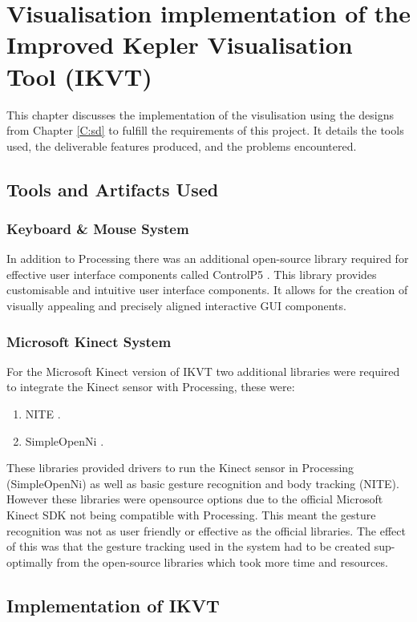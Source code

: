 \chapter{Visualisation implementation of the Improved Kepler Visualisation Tool
(IKVT)}\label{C:imp}
This chapter discusses the implementation of the visulisation using the designs
from Chapter \ref{C:sd} to fulfill the requirements of this project.
It details the tools used, the deliverable features
produced, and the problems encountered. 

\section{Tools and Artifacts Used}
\subsection{Keyboard \& Mouse System}
In addition to Processing there was an additional open-source
library required for effective user interface components called ControlP5
\cite{controlp5}. This library provides customisable and intuitive user
interface components. It allows for the creation of visually appealing and
precisely
aligned interactive GUI components.

\subsection{Microsoft Kinect System}
For the Microsoft Kinect version of IKVT two additional libraries were required
to integrate the Kinect sensor
with Processing, these were:
\begin{enumerate}
 \item NITE \cite{nite}.
 \item SimpleOpenNi \cite{simpleopenni}.
\end{enumerate}
These libraries provided drivers to run the Kinect sensor in Processing
(SimpleOpenNi) as well
as basic gesture recognition and body tracking (NITE). However these libraries
were
opensource options due to the official Microsoft Kinect SDK not being compatible
with
Processing. This meant the gesture recognition was not as user friendly or
effective as the
official libraries. The effect of this was that the gesture tracking used in the
system had to be created sup-optimally from the open-source libraries which took
more time and resources. 

\section{Implementation of IKVT}

